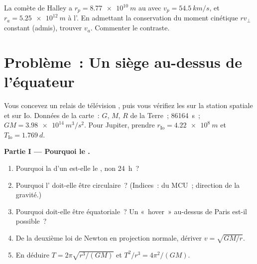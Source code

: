 \begin{exercise}[$\star\star\star$]\label{exo:g12:satellites-kepler:15}
La comète de Halley a $r_p = \qty{8.77e10}{m}$ au
 avec $v_p = \qty{54.5}{km/s}$, et
$r_a = \qty{5.25e12}{m}$ à l'. En admettant la
conservation du moment cinétique $r v_\perp$ constant (admis), trouver
$v_a$. Commenter le contraste.
\end{exercise}


\section{Problème~: Un siège au-dessus de l'équateur}

\begin{problem}
\label{pb:g12:satellites-kepler:1}
Vous concevez un relais de télévision , puis vous
vérifiez les  sur la station spatiale et sur Io. Données
de la carte~: $G$, $M$, $R$ de la Terre~; 
\qty{86164}{s}~; $GM = \qty{3.98e14}{m^3/s^2}$. Pour Jupiter,
prendre $r_{\text{Io}} = \qty{4.22e8}{m}$ et
$T_{\text{Io}} = \qty{1.769}{d}$.

\medskip
\noindent\textbf{Partie I --- Pourquoi le .}
\begin{enumerate}
  \item Pourquoi la  d'un 
         est-elle le , non \qty{24}{h}~?
  \item Pourquoi l' doit-elle être circulaire~?
        (Indices~:  du MCU~; direction de la gravité.)
  \item Pourquoi doit-elle être équatoriale~? Un «~hover~» au-dessus de
        Paris est-il possible~?
  \item De la deuxième loi de Newton en projection
        normale, dériver $v = \sqrt{GM/r}$.
  \item En déduire $T = 2\pi\sqrt{r^3/(GM)}$ et $T^2/r^3 = 4\pi^2/(GM)$.
\end{enumerate}


\end{problem}

